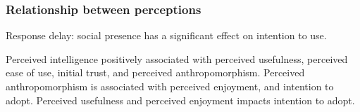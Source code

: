 \documentclass[sigconf,screen,review, anonymous]{acmart}
\newcommand{\cmt}[1]{}%
\begin{document}




\subsubsection{Relationship between perceptions}

Response delay: social presence has a significant effect on intention to use. 
\cite{gnewuch2022opposing}\cmt{[20]}

Perceived intelligence positively associated with perceived usefulness, perceived ease of use, initial trust, and perceived anthropomorphism. Perceived anthropomorphism is associated with perceived enjoyment, and intention to adopt. Perceived usefulness and perceived enjoyment impacts intention to adopt. \cite{moussawi2021perceptions}\cmt{[36]}
\end{document}
